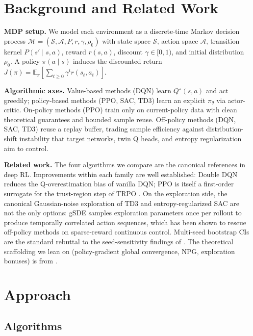 \documentclass{article}
\begin{document}
\section{Background and Related Work}
\label{sec:background}

\textbf{MDP setup.} We model each environment as a discrete-time Markov decision process $\mathcal{M} = (\mathcal{S}, \mathcal{A}, P, r, \gamma, \rho_0)$ with state space $\mathcal{S}$, action space $\mathcal{A}$, transition kernel $P(s' \mid s, a)$, reward $r(s, a)$, discount $\gamma \in [0, 1)$, and initial distribution $\rho_0$. A policy $\pi(a \mid s)$ induces the discounted return $J(\pi) = \mathbb{E}_{\pi}[\sum_{t \geq 0} \gamma^{t} r(s_t, a_t)]$.

\textbf{Algorithmic axes.} Value-based methods (DQN) learn $Q^{\star}(s, a)$ and act greedily; policy-based methods (PPO, SAC, TD3) learn an explicit $\pi_\theta$ via actor-critic. On-policy methods (PPO) train only on current-policy data with clean theoretical guarantees and bounded sample reuse. Off-policy methods (DQN, SAC, TD3) reuse a replay buffer, trading sample efficiency against distribution-shift instability that target networks, twin Q heads, and entropy regularization aim to control.

\textbf{Related work.} The four algorithms we compare are the canonical references in deep RL. Improvements within each family are well established: Double DQN \cite{vanhasselt2016double} reduces the Q-overestimation bias of vanilla DQN; PPO \cite{schulman2017proximal} is itself a first-order surrogate for the trust-region step of TRPO \cite{schulman2015trust}. On the exploration side, the canonical Gaussian-noise exploration of TD3 and entropy-regularized SAC are not the only options: gSDE \cite{raffin2022smooth} samples exploration parameters once per rollout to produce temporally correlated action sequences, which has been shown to rescue off-policy methods on sparse-reward continuous control. Multi-seed bootstrap CIs are the standard rebuttal to the seed-sensitivity findings of \cite{henderson2018deep}. The theoretical scaffolding we lean on (policy-gradient global convergence, NPG, exploration bonuses) is from \cite{agarwal2020theory, mei2020softmax, cai2020provably}.


\section{Approach}
\label{sec:approach}

\subsection{Algorithms}
\label{sec:methods}
\end{document}
